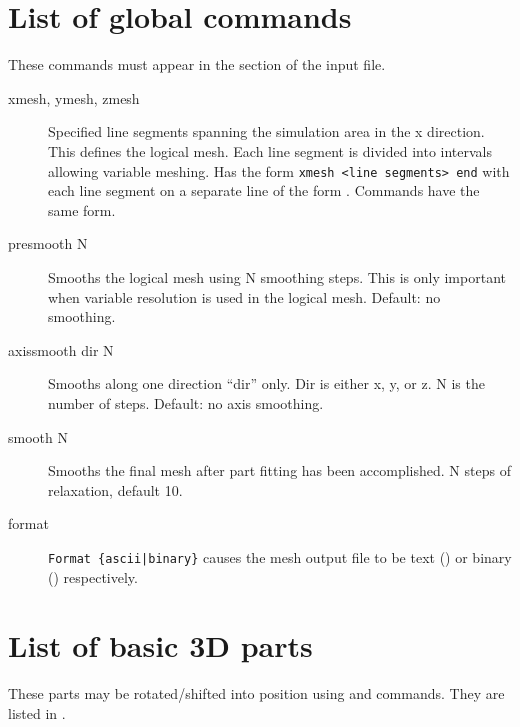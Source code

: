 \documentclass[a4paper,twoside,11pt]{book}
\begin{document}
\section{List of global commands}

These commands must appear in the  section of the input file.

\begin{description}
  \item[xmesh, ymesh, zmesh] Specified line segments spanning the simulation
    area in the x direction. This defines the logical mesh. Each line
    segment is divided into intervals allowing variable meshing. Has
    the form \verb+xmesh <line segments> end+ with each line segment
    on a separate line of the form . Commands
     have the same form.
  \item[presmooth N] Smooths the logical mesh using N smoothing
    steps. This is only important when variable resolution is used in
    the logical mesh. Default: no smoothing.
  \item[axissmooth dir N] Smooths along one direction ``dir''
    only. Dir is either x, y, or z. N is the number of steps. Default:
    no axis smoothing.
  \item[smooth N] Smooths the final mesh after part fitting has been
    accomplished. N steps of relaxation, default 10.
  \item[format] \verb+Format {ascii|binary}+ causes the mesh output
    file to be text () or binary () respectively.
\end{description}

\section{List of basic 3D parts}

These parts may be rotated/shifted into position using 
and  commands. They are listed in .
\end{document}
